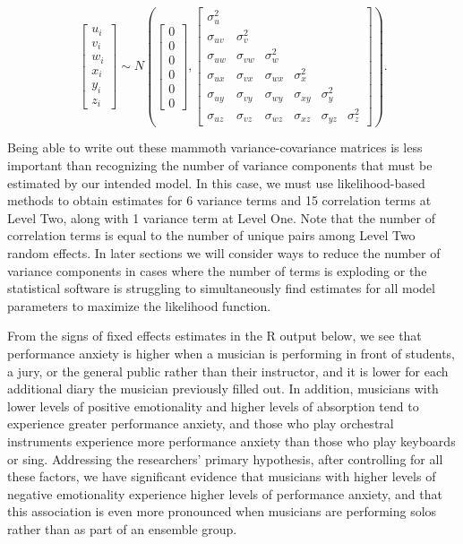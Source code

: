 \documentclass[
]{krantz}
\begin{document}
\[ \left[ \begin{array}{c}
            u_{i} \\ v_{i} \\ w_{i} \\ x_{i} \\ y_{i} \\ z_{i}
          \end{array}  \right] \sim N \left( \left[
          \begin{array}{c}
            0 \\ 0 \\ 0 \\ 0 \\ 0 \\ 0
          \end{array} \right], \left[
          \begin{array}{cccccc}
            \sigma_{u}^{2} & & & & & \\
            \sigma_{uv} & \sigma_{v}^{2} & & & & \\
            \sigma_{uw} & \sigma_{vw} & \sigma_{w}^{2} & & & \\
            \sigma_{ux} & \sigma_{vx} & \sigma_{wx} & \sigma_{x}^{2} & & \\
            \sigma_{uy} & \sigma_{vy} & \sigma_{wy} & \sigma_{xy} & \sigma_{y}^{2} & \\
            \sigma_{uz} & \sigma_{vz} & \sigma_{wz} & \sigma_{xz} & \sigma_{yz} & \sigma_{z}^{2}
          \end{array} \right] \right). \]

Being able to write out these mammoth variance-covariance matrices is less important than recognizing the number of variance components that must be estimated by our intended model. In this case, we must use likelihood-based methods to obtain estimates for 6 variance terms and 15 correlation terms at Level Two, along with 1 variance term at Level One. Note that the number of correlation terms is equal to the number of unique pairs among Level Two random effects. In later sections we will consider ways to reduce the number of variance components in cases where the number of terms is exploding or the statistical software is struggling to simultaneously find estimates for all model parameters to maximize the likelihood function.

From the signs of fixed effects estimates in the R output below, we see that performance anxiety is higher when a musician is performing in front of students, a jury, or the general public rather than their instructor, and it is lower for each additional diary the musician previously filled out. In addition, musicians with lower levels of positive emotionality and higher levels of absorption tend to experience greater performance anxiety, and those who play orchestral instruments experience more performance anxiety than those who play keyboards or sing. Addressing the researchers' primary hypothesis, after controlling for all these factors, we have significant evidence that musicians with higher levels of negative emotionality experience higher levels of performance anxiety, and that this association is even more pronounced when musicians are performing solos rather than as part of an ensemble group.
\end{document}

